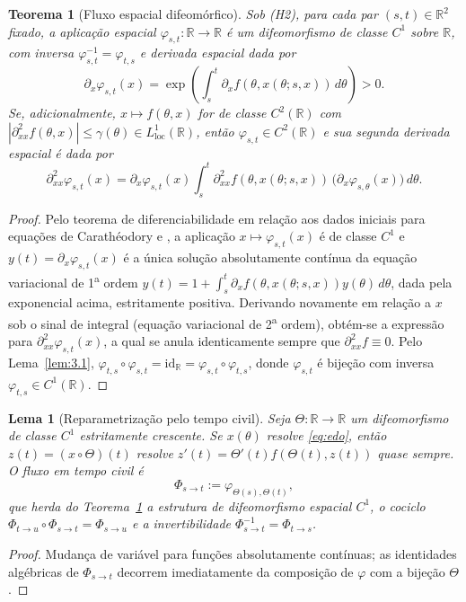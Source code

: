 \documentclass[11pt, a4paper]{article}
\theoremstyle{definition}
\theoremstyle{plain}
\newtheorem{teorema}[definicao]{Teorema}
\newtheorem{lema}[definicao]{Lema}
\theoremstyle{remark}
\begin{document}
\begin{teorema}[Fluxo espacial difeomórfico]\label{teo:3.2}
Sob (H2), para cada par $(s, t) \in \mathbb{R}^2$ fixado, a aplicação espacial $\varphi_{s,t} : \mathbb{R} \to \mathbb{R}$ é um difeomorfismo de classe $C^1$ sobre $\mathbb{R}$, com inversa $\varphi_{s,t}^{-1} = \varphi_{t,s}$ e derivada espacial dada por
\[
\partial_x \varphi_{s,t}(x) = \exp\left(\int_s^t \partial_x f(\theta, x(\theta; s, x))\,d\theta\right) > 0.
\]
Se, adicionalmente, $x \mapsto f(\theta, x)$ for de classe $C^2(\mathbb{R})$ com $|\partial_{xx}^2 f(\theta, x)| \le \gamma(\theta) \in L^1_{\text{loc}}(\mathbb{R})$, então $\varphi_{s,t} \in C^2(\mathbb{R})$ e sua segunda derivada espacial é dada por
\[
\partial_{xx}^2 \varphi_{s,t}(x) = \partial_x \varphi_{s,t}(x) \int_s^t \partial_{xx}^2 f(\theta, x(\theta; s, x))\,\big(\partial_x \varphi_{s,\theta}(x)\big)\,d\theta.
\]
\end{teorema}
\begin{proof}
Pelo teorema de diferenciabilidade em relação aos dados iniciais para equações de Carathéodory \cite[Cap.~2, Thm.~4.1]{CoddingtonLevinson1955} e \cite[Cap.~V]{Hartman2002}, a aplicação $x \mapsto \varphi_{s,t}(x)$ é de classe $C^1$ e $y(t) = \partial_x \varphi_{s,t}(x)$ é a única solução absolutamente contínua da equação variacional de 1\textsuperscript{a} ordem $y(t) = 1 + \int_s^t \partial_x f(\theta, x(\theta; s, x))y(\theta)\,d\theta$, dada pela exponencial acima, estritamente positiva. Derivando novamente em relação a $x$ sob o sinal de integral (equação variacional de 2\textsuperscript{a} ordem), obtém-se a expressão para $\partial_{xx}^2 \varphi_{s,t}(x)$, a qual se anula identicamente sempre que $\partial_{xx}^2 f \equiv 0$. Pelo Lema~\ref{lem:3.1}, $\varphi_{t,s} \circ \varphi_{s,t} = \mathrm{id}_{\mathbb{R}} = \varphi_{s,t} \circ \varphi_{t,s}$, donde $\varphi_{s,t}$ é bijeção com inversa $\varphi_{t,s} \in C^1(\mathbb{R})$.
\end{proof}

\begin{lema}[Reparametrização pelo tempo civil]\label{lem:3.3}
Seja $\Theta : \mathbb{R} \to \mathbb{R}$ um difeomorfismo de classe $C^1$ estritamente crescente. Se $x(\theta)$ resolve \eqref{eq:edo}, então $z(t) = (x \circ \Theta)(t)$ resolve $z'(t) = \Theta'(t) f(\Theta(t), z(t))$ quase sempre. O fluxo em tempo civil é
\[
\Phi_{s \to t} := \varphi_{\Theta(s), \Theta(t)},
\]
que herda do Teorema~\ref{teo:3.2} a estrutura de difeomorfismo espacial $C^1$, o cociclo $\Phi_{t \to u} \circ \Phi_{s \to t} = \Phi_{s \to u}$ e a invertibilidade $\Phi_{s \to t}^{-1} = \Phi_{t \to s}$.
\end{lema}
\begin{proof}
Mudança de variável para funções absolutamente contínuas; as identidades algébricas de $\Phi_{s \to t}$ decorrem imediatamente da composição de $\varphi$ com a bijeção $\Theta$.
\end{proof}
\end{document}
